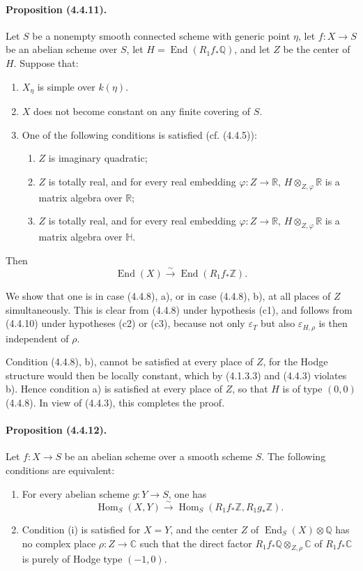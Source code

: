 \documentclass[10pt]{article}
\newcommand{\C}{\mathbb C}
\newcommand{\Q}{\mathbb Q}
\newcommand{\Z}{\mathbb Z}
\newcommand{\Hom}{\operatorname{Hom}}
\newcommand{\iso}{\xrightarrow{\sim}}
\newcommand{\R}{\mathbb R}
\providecommand{\End}{\operatorname{End}}
\begin{document}
\paragraph{Proposition (4.4.11).} Let $S$ be a nonempty smooth connected scheme with generic point $\eta$, let $f:X\to S$ be an abelian scheme over $S$, let $H=\End(R_1f_*\Q)$, and let $Z$ be the center of $H$. Suppose that:
\begin{enumerate}[label=(\alph*)]
\item $X_\eta$ is simple over $k(\eta)$.
\item $X$ does not become constant on any finite covering of $S$.
\item One of the following conditions is satisfied (cf. (4.4.5)):
\begin{enumerate}[label=(c\arabic*)]
\item $Z$ is imaginary quadratic;
\item $Z$ is totally real, and for every real embedding $\varphi:Z\to\R$, $H\otimes_{Z,\varphi}\R$ is a matrix algebra over $\R$;
\item $Z$ is totally real, and for every real embedding $\varphi:Z\to\R$, $H\otimes_{Z,\varphi}\R$ is a matrix algebra over $\mathbb H$.
\end{enumerate}
\end{enumerate}
Then
\[
\End(X)\iso\End(R_1f_*\Z).
\]

We show that one is in case (4.4.8), a), or in case (4.4.8), b), at all places of $Z$ simultaneously. This is clear from (4.4.8) under hypothesis (c1), and follows from (4.4.10) under hypotheses (c2) or (c3), because not only $\varepsilon_T$ but also $\varepsilon_{H,\rho}$ is then independent of $\rho$.

Condition (4.4.8), b), cannot be satisfied at every place of $Z$, for the Hodge structure would then be locally constant, which by (4.1.3.3) and (4.4.3) violates b). Hence condition a) is satisfied at every place of $Z$, so that $H$ is of type $(0,0)$ (4.4.8). In view of (4.4.3), this completes the proof.

\paragraph{Proposition (4.4.12).} Let $f:X\to S$ be an abelian scheme over a smooth scheme $S$. The following conditions are equivalent:
\begin{enumerate}[label=(\roman*)]
\item For every abelian scheme $g:Y\to S$, one has
\[
\Hom_S(X,Y)\iso \Hom_S(R_1f_*\Z,R_1g_*\Z).
\]
\item Condition (i) is satisfied for $X=Y$, and the center $Z$ of $\End_S(X)\otimes\Q$ has no complex place $\rho:Z\to\C$ such that the direct factor $R_1f_*\Q\otimes_{Z,\rho}\C$ of $R_1f_*\C$ is purely of Hodge type $(-1,0)$.
\end{enumerate}
\end{document}
